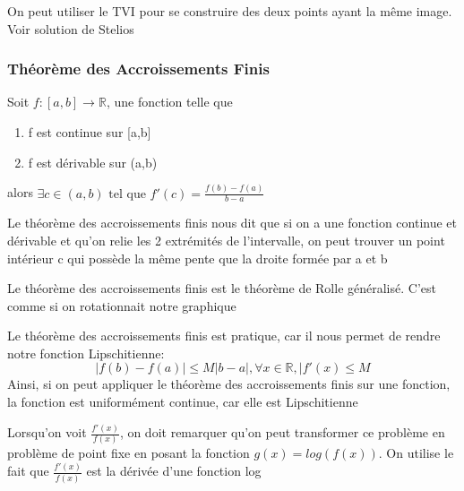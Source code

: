 \documentclass{article}
\begin{document}
\begin{problem}[Montrer que si f est continue, dérivable et
    $\lim_{n \to -\infty} f(x) = \infty$
    et $\lim_{n \to \infty} f(x) = \infty$, alors il existe c tel que
    f'(c) = 0]
    On peut utiliser le TVI pour se construire des deux points ayant la
    même image. Voir solution de Stelios
\end{problem}


\subsubsection{Théorème des Accroissements Finis}

\begin{theorem}
    Soit $f:[a,b] \to \mathbb{R}$, une fonction telle que
    \begin{enumerate}
	\item f est continue sur [a,b]
	\item f est dérivable sur (a,b)
    \end{enumerate}
    alors $\exists c \in (a,b) \text{ tel que } f'(c)=\frac{f(b) - f(a)}
    {b-a}$
\end{theorem}

\begin{intuition}
    Le théorème des accroissements finis nous dit que si on a une
    fonction continue et dérivable et qu'on relie les 2 extrémités
    de l'intervalle, on peut trouver un point intérieur c qui possède
    la même pente que la droite formée par a et b
\end{intuition}

\begin{remark}
    Le théorème des accroissements finis est le théorème de Rolle
    généralisé. C'est comme si on rotationnait notre graphique
\end{remark}

\begin{remark}
    Le théorème des accroissements finis est pratique, car il nous
    permet de rendre notre fonction Lipschitienne:
    $$ |f(b) - f(a)| \leq M |b-a|, \forall x \in \mathbb{R},
    |f'(x) \leq M$$
    Ainsi, si on peut appliquer le théorème des accroissements finis
    sur une fonction, la fonction est uniformément continue, car elle
    est Lipschitienne
\end{remark}

\begin{intuition}[$ \frac{f'(x)}{f(x)}$ ]
    Lorsqu'on voit $ \frac{f'(x)}{f(x)}$, on doit remarquer qu'on peut
    transformer ce problème en problème de point fixe en posant la
    fonction $ g(x)= log(f(x))$. On utilise le fait que
    $ \frac{f'(x)}{f(x)}$ est la dérivée d'une fonction log
\end{intuition}
\end{document}

